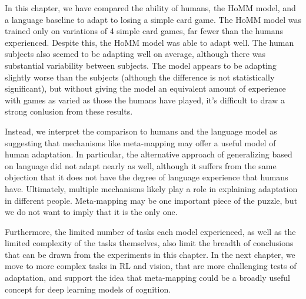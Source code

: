 In this chapter, we have compared the ability of humans, the HoMM model, and a language baseline to adapt to losing a simple card game. The HoMM model was trained only on variations of 4 simple card games, far fewer than the humans experienced. Despite this, the HoMM model was able to adapt well. The human subjects also seemed to be adapting well on average, although there was substantial variability between subjects. The model appears to be adapting slightly worse than the subjects (although the difference is not statistically significant), but without giving the model an equivalent amount of experience with games as varied as those the humans have played, it's difficult to draw a strong conlusion from these results. \par
Instead, we interpret the comparison to humans and the language model as suggesting that mechanisms like meta-mapping may offer a useful model of human adaptation. In particular, the alternative approach of generalizing based on language did not adapt nearly as well, although it suffers from the same objection that it does not have the degree of language experience that humans have. Ultimately, multiple mechanisms likely play a role in explaining adaptation in different people. Meta-mapping may be one important piece of the puzzle, but we do not want to imply that it is the only one. \par 
Furthermore, the limited number of tasks each model experienced, as well as the limited complexity of the tasks themselves, also limit the breadth of conclusions that can be drawn from the experiments in this chapter. In the next chapter, we move to more complex tasks in RL and vision, that are more challenging tests of adaptation, and support the idea that meta-mapping could be a broadly useful concept for deep learning models of cognition. \par  
